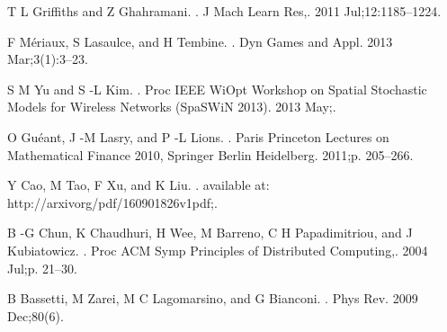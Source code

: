 \documentclass{book}
\begin{document}
\begin{thebibliography}{10}
  {T  L  Griffiths and Z  Ghahramani}.
  .
  \newblock J Mach Learn Res,. 2011 Jul;12:1185--1224.
  
  {F  M\'eriaux, S  Lasaulce, and H  Tembine}.
  .
  \newblock Dyn Games and Appl. 2013 Mar;3(1):3--23.
  
  {S  M  Yu and S -L  Kim}.
  .
  \newblock Proc IEEE WiOpt Workshop on Spatial Stochastic Models for Wireless
    Networks (SpaSWiN 2013). 2013 May;.
  
  {O  Gu\'eant, J -M  Lasry, and P -L  Lions}.
  .
  \newblock Paris Princeton Lectures on Mathematical Finance 2010, Springer
    Berlin Heidelberg. 2011;p. 205--266.
  
  {Y  Cao, M  Tao, F  Xu, and K  Liu}.
  .
  \newblock available at: http://arxivorg/pdf/160901826v1pdf;.
  
  {B -G  Chun, K  Chaudhuri, H  Wee, M  Barreno, C  H  Papadimitriou, and J
    Kubiatowicz}.
  .
  \newblock Proc ACM Symp Principles of Distributed Computing,. 2004 Jul;p.
    21--30.
  
  {B  Bassetti, M  Zarei, M  C  Lagomarsino, and G  Bianconi}.
  .
  \newblock Phys Rev. 2009 Dec;80(6).
  
  \end{thebibliography}
  
\end{document}
